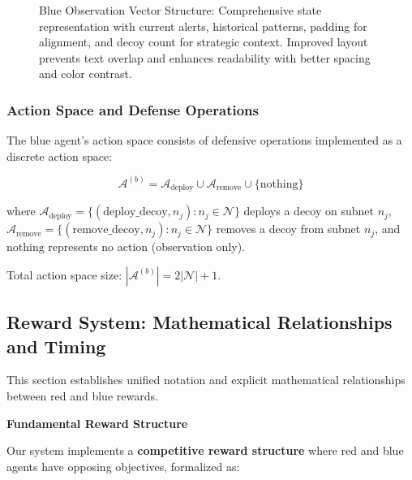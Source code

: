 \documentclass[12pt,oneside]{article}
\begin{document}
\begin{figure}[htbp]
\caption{Blue Observation Vector Structure: Comprehensive state representation with current alerts, historical patterns, padding for alignment, and decoy count for strategic context. Improved layout prevents text overlap and enhances readability with better spacing and color contrast.}
\label{fig:observation_vector}
\end{figure}

\subsubsection{Action Space and Defense Operations}

The blue agent's action space consists of defensive operations implemented as a discrete action space:

\begin{equation}
\mathcal{A}^{(b)} = \mathcal{A}_{\text{deploy}} \cup \mathcal{A}_{\text{remove}} \cup \{\text{nothing}\}
\end{equation}

where $\mathcal{A}_{\text{deploy}} = \{(\text{deploy\_decoy}, n_j) : n_j \in \mathcal{N}\}$ deploys a decoy on subnet $n_j$, $\mathcal{A}_{\text{remove}} = \{(\text{remove\_decoy}, n_j) : n_j \in \mathcal{N}\}$ removes a decoy from subnet $n_j$, and $\text{nothing}$ represents no action (observation only).

Total action space size: $|\mathcal{A}^{(b)}| = 2|\mathcal{N}| + 1$.

\subsection{Reward System: Mathematical Relationships and Timing}

This section establishes unified notation and explicit mathematical relationships between red and blue rewards.

\textbf{Fundamental Reward Structure}

Our system implements a \textbf{competitive reward structure} where red and blue agents have opposing objectives, formalized as:
\end{document}

